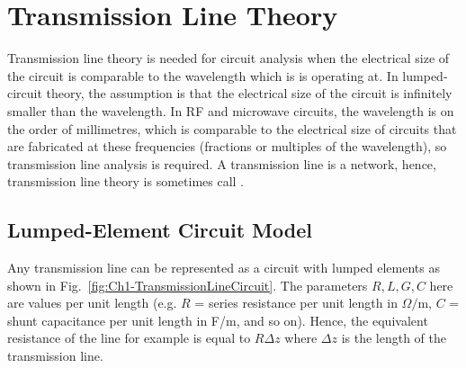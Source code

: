 \chapter{Transmission Line Theory} \label{ch:TransmissionLineTheory}

Transmission line theory is needed for circuit analysis when the electrical size of the circuit is comparable to the wavelength which is is operating at. In lumped-circuit theory, the assumption is that the electrical size of the circuit is infinitely smaller than the wavelength. In RF and microwave circuits, the wavelength is on the order of millimetres, which is comparable to the electrical size of circuits that are fabricated at these frequencies (fractions or multiples of the wavelength), so transmission line analysis is required. A transmission line is a  network, hence, transmission line theory is sometimes call . 

\section{Lumped-Element Circuit Model}
Any transmission line can be represented as a circuit with lumped elements as shown in Fig.\ \ref{fig:Ch1-TransmissionLineCircuit}. The parameters $R, L, G, C$ here are values per unit length (e.g. $R$ = series resistance per unit length in $\Omega/\text{m}$, $C$ = shunt capacitance per unit length in F/m, and so on). Hence, the equivalent resistance of the line for example is equal to $R\Delta z$ where $\Delta z$ is the length of the transmission line. 

